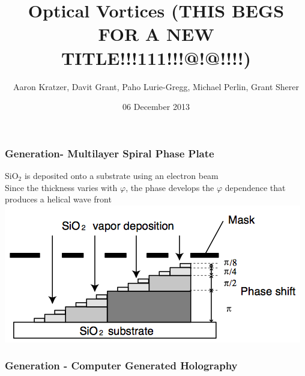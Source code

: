 \documentclass[xcolor=dvipsnames]{beamer}
\title{Optical Vortices (THIS BEGS FOR A NEW TITLE!!!111!!!@!@!!!!)}
\author{Aaron Kratzer, Davit Grant, Paho Lurie-Gregg,
  Michael Perlin, Grant Sherer}
\date{06 December 2013}
\renewcommand{\phi}{\varphi} %
\begin{document}
\begin{frame}
	\frametitle{Generation-  Multilayer Spiral Phase Plate}
	SiO$_2$ is deposited onto a substrate using an electron beam
	\\Since the thickness varies with $\phi$, the phase develops the $\phi$ dependence that produces a helical wave front
	\\\centering
	\includegraphics[scale=.3]{MSPP.jpg}
\end{frame}


\begin{frame}
	\frametitle{Generation - Computer Generated Holography}
	\centering
	
\end{frame}




\end{document}
